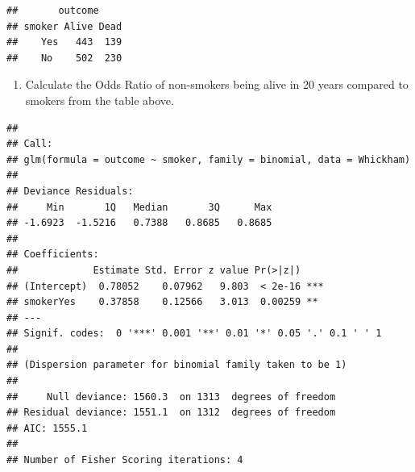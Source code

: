\documentclass[]{article}
\newenvironment{Shaded}{\begin{snugshade}}{\end{snugshade}}
\newcommand{\DataTypeTok}[1]{\textcolor[rgb]{0.13,0.29,0.53}{#1}}
\newcommand{\KeywordTok}[1]{\textcolor[rgb]{0.13,0.29,0.53}{\textbf{#1}}}
\newcommand{\NormalTok}[1]{#1}
\newcommand{\OperatorTok}[1]{\textcolor[rgb]{0.81,0.36,0.00}{\textbf{#1}}}
\newcommand{\OtherTok}[1]{\textcolor[rgb]{0.56,0.35,0.01}{#1}}
\newcommand{\StringTok}[1]{\textcolor[rgb]{0.31,0.60,0.02}{#1}}
\providecommand{\tightlist}{%
  \setlength{\itemsep}{0pt}\setlength{\parskip}{0pt}}
\begin{document}
\begin{Shaded}
\end{Shaded}

\begin{verbatim}
##       outcome
## smoker Alive Dead
##    Yes   443  139
##    No    502  230
\end{verbatim}

\begin{enumerate}
\def\labelenumi{\arabic{enumi}.}
\setcounter{enumi}{2}
\tightlist
\item
  Calculate the Odds Ratio of non-smokers being alive in 20 years
  compared to smokers from the table above. \vspace{3in}
\end{enumerate}

\begin{Shaded}
\end{Shaded}

\begin{verbatim}
## 
## Call:
## glm(formula = outcome ~ smoker, family = binomial, data = Whickham)
## 
## Deviance Residuals: 
##     Min       1Q   Median       3Q      Max  
## -1.6923  -1.5216   0.7388   0.8685   0.8685  
## 
## Coefficients:
##             Estimate Std. Error z value Pr(>|z|)    
## (Intercept)  0.78052    0.07962   9.803  < 2e-16 ***
## smokerYes    0.37858    0.12566   3.013  0.00259 ** 
## ---
## Signif. codes:  0 '***' 0.001 '**' 0.01 '*' 0.05 '.' 0.1 ' ' 1
## 
## (Dispersion parameter for binomial family taken to be 1)
## 
##     Null deviance: 1560.3  on 1313  degrees of freedom
## Residual deviance: 1551.1  on 1312  degrees of freedom
## AIC: 1555.1
## 
## Number of Fisher Scoring iterations: 4
\end{verbatim}
\end{document}
